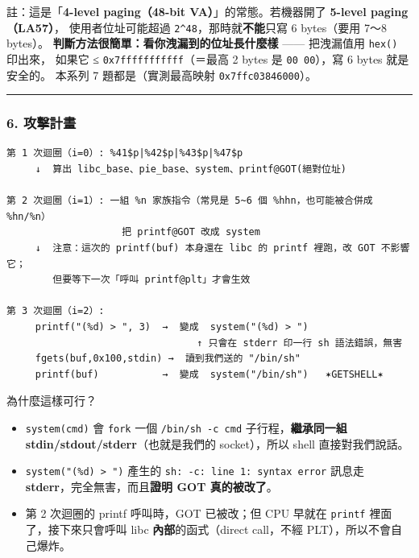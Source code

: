 \documentclass[10pt,a4paper]{article}
\providecommand{\tightlist}{%
  \setlength{\itemsep}{0pt}\setlength{\parskip}{0pt}}
\renewenvironment{quote}{%
  \begin{mdframed}[linewidth=0pt,innerleftmargin=0pt,innerrightmargin=0pt,
    innerbottommargin=0pt,innertopmargin=0pt,skipabove=0.55em,skipbelow=0.55em,
    leftmargin=0.9em,rightmargin=0.4em,startcode={\color{quotebar}\vrule width 2.6pt},%
    endcode={}]%
  \itshape\color{black}%
}{%
  \end{mdframed}%
}
\begin{document}
\begin{quote}
註：這是「\textbf{4-level paging（48-bit VA）}」的常態。若機器開了
\textbf{5-level paging（LA57）}， 使用者位址可能超過
\texttt{2\^\allowbreak{}{}\allowbreak{}48}，那時就\textbf{不能}只寫 6 bytes（要用 7～8 bytes）。
\textbf{判斷方法很簡單：看你洩漏到的位址長什麼樣} ------ 把洩漏值用
\texttt{hex()} 印出來， 如果它 ≤ \texttt{0x7fffffffffff}（＝最高 2 bytes
是 \texttt{00\ \allowbreak{}00}），寫 6 bytes 就是安全的。 本系列 7
題都是（實測最高映射 \texttt{0x7ffc03846000}）。
\end{quote}

\begin{center}\rule{0.5\linewidth}{0.5pt}\end{center}

\subsubsection{6. 攻擊計畫}\label{ux653bux64caux8a08ux756b}

\begin{Verbatim}[breaklines=true,breakanywhere=true,breakautoindent=false,fontsize=\fontsize{7.0}{9.5}\selectfont]
第 1 次迴圈（i=0）: %41$p|%42$p|%43$p|%47$p
     ↓  算出 libc_base、pie_base、system、printf@GOT(絕對位址)

第 2 次迴圈（i=1）: 一組 %n 家族指令（常見是 5~6 個 %hhn，也可能被合併成 %hn/%n）
                    把 printf@GOT 改成 system
     ↓  注意：這次的 printf(buf) 本身還在 libc 的 printf 裡跑，改 GOT 不影響它；
        但要等下一次「呼叫 printf@plt」才會生效

第 3 次迴圈（i=2）: 
     printf("(%d) > ", 3)  →  變成  system("(%d) > ")
                                 ↑ 只會在 stderr 印一行 sh 語法錯誤，無害
     fgets(buf,0x100,stdin) →  讀到我們送的 "/bin/sh"
     printf(buf)           →  變成  system("/bin/sh")   ✶GETSHELL✶
\end{Verbatim}

為什麼這樣可行？

\begin{itemize}
\tightlist
\item
  \texttt{system(cmd)} 會 \texttt{fork} 一個 \texttt{/\allowbreak{}bin/\allowbreak{}sh\ \allowbreak{}-\allowbreak{}c\ \allowbreak{}cmd}
  子行程，\textbf{繼承同一組 stdin/stdout/stderr}（也就是我們的
  socket），所以 shell 直接對我們說話。
\item
  \texttt{system("(\%\allowbreak{}d)\ \allowbreak{}\textgreater{}\allowbreak{}\ \allowbreak{}")} 產生的
  \texttt{sh:\allowbreak{}\ \allowbreak{}-\allowbreak{}c:\allowbreak{}\ \allowbreak{}line\ \allowbreak{}1:\allowbreak{}\ \allowbreak{}syntax\ \allowbreak{}error} 訊息走
  \textbf{stderr}，完全無害，而且\textbf{證明 GOT 真的被改了}。
\item
  第 2 次迴圈的 printf 呼叫時，GOT 已被改；但 CPU 早就在 \texttt{printf}
  裡面了，接下來只會呼叫 libc \textbf{內部}的函式（direct call，不經
  PLT），所以不會自己爆炸。
\end{itemize}
\end{document}
